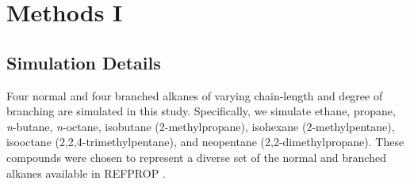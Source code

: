 \documentclass[preprint,letterpaper,floatfix,citeautoscript,aip,jcp]{revtex4-1}
\begin{document}

\section{Methods I} \label{Methods I}

\subsection{Simulation Details}
Four normal and four branched alkanes of varying chain-length and degree of branching are simulated in this study. Specifically, we simulate ethane, propane, \textit{n}-butane, \textit{n}-octane, isobutane (2-methylpropane), isohexane (2-methylpentane), isooctane (2,2,4-trimethylpentane), and neopentane (2,2-dimethylpropane). These compounds were chosen to represent a diverse set of the normal and branched alkanes available in REFPROP \cite{LEMMON-RP91,Ethane2006,Propane2009,Butane2006,Beckmueller2017,Lemmon2006,Blackham2017}.
\end{document}
